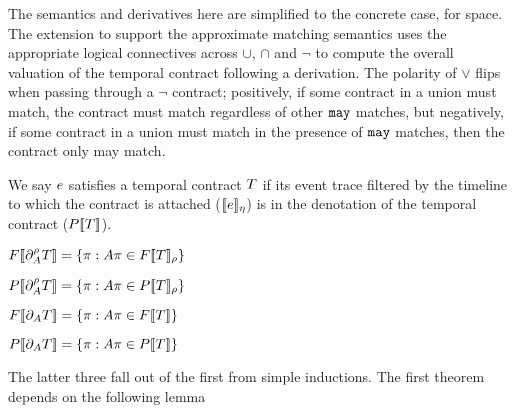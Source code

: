 The semantics and derivatives here are simplified to the concrete case, for space.
%
The extension to support the approximate matching semantics uses the appropriate logical connectives across $\cup$, $\cap$ and $\neg$ to compute the overall valuation of the temporal contract following a derivation.
%
The polarity of $\vee$ flips when passing through a $\neg$ contract; positively, if some contract in a union must match, the contract must match regardless of other ${\tt may}$ matches, but negatively, if some contract in a union must match in the presence of ${\tt may}$ matches, then the contract only may match.

We say $e$ satisfies a temporal contract $T$ if its event trace filtered by the timeline to which the contract is attached ($[\![ e ]\!]_\eta$) is in the denotation of the temporal contract ($P[\![ T ]\!]$).
%

\begin{theorem}[Full]
 $F[\![ \partial_{A}^{\rho}{T} ]\!] = \left\{\pi : A\pi \in F[\![ T ]\!]_{\rho}\right\}$
\end{theorem}

\begin{theorem}[Partial]
 $P[\![ \partial_{A}^{\rho}{T} ]\!] = \left\{\pi : A\pi \in P[\![ T ]\!]_{\rho}\right\}$
\end{theorem}

\begin{theorem}
 $F[\![ \partial_{A}{T} ]\!] = \left\{\pi : A\pi \in F[\![ T ]\!]\right\}$
\end{theorem}

\begin{theorem}
 $P[\![ \partial_{A}{T} ]\!] = \left\{\pi : A\pi \in P[\![ T ]\!]\right\}$
\end{theorem}

The latter three fall out of the first from simple inductions.
%
The first theorem depends on the following lemma

